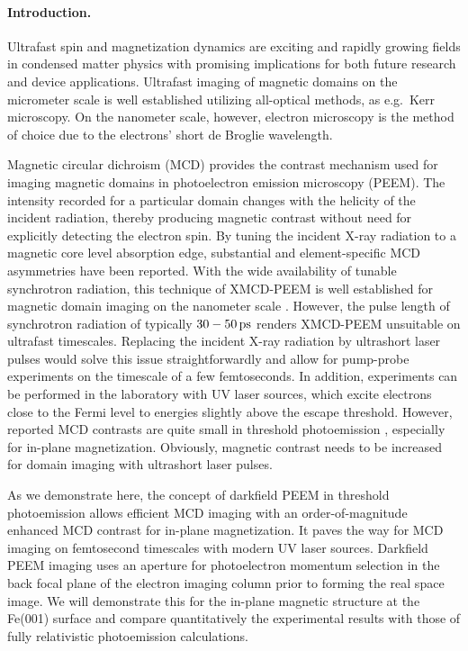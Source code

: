 \documentclass[prl,twocolumn,floatfix,superscriptaddress,aps]{revtex4-2}
\begin{document}
\pacs{}

\maketitle
\paragraph{Introduction.} Ultrafast spin and magnetization dynamics are exciting and rapidly growing fields in condensed matter physics with promising implications for both future research and device applications. Ultrafast imaging of magnetic domains on the micrometer scale is well established utilizing all-optical methods, as e.g.\ Kerr microscopy. On the nanometer scale, however, electron microscopy is the method of choice due to the electrons' short de Broglie wavelength. 

Magnetic circular dichroism (MCD) provides the contrast mechanism used for imaging magnetic domains in photoelectron emission microscopy (PEEM). The intensity recorded for a particular domain changes with the helicity of the incident radiation, thereby producing magnetic contrast without need for explicitly detecting the electron spin. By tuning the incident X-ray radiation to a magnetic core level absorption edge, substantial and element-specific MCD asymmetries have been reported. With the wide availability of tunable synchrotron radiation, this technique of XMCD-PEEM is well established for magnetic domain imaging on the nanometer scale \cite{kuch15}. However, the pulse length of synchrotron radiation of typically $\unit[30-50]{ps}$ renders XMCD-PEEM unsuitable on ultrafast timescales. Replacing the incident X-ray radiation by ultrashort laser pulses would solve this issue straightforwardly and allow for pump-probe experiments on the timescale of a  few femtoseconds. In addition, experiments can be performed in the laboratory with UV laser sources, which excite electrons close to the Fermi level to energies slightly above the escape threshold. However, reported MCD contrasts are quite small in threshold photoemission \cite{marx2000}, especially for in-plane magnetization. Obviously, magnetic contrast needs to be increased for domain imaging with ultrashort laser pulses.

As we demonstrate here, the concept of darkfield PEEM in threshold photoemission allows efficient MCD imaging with an order-of-magnitude enhanced MCD contrast for in-plane magnetization. It paves the way for MCD imaging on femtosecond timescales with modern UV laser sources. Darkfield PEEM imaging uses an aperture for photoelectron momentum selection in the back focal plane of the electron imaging column prior to forming the real space image. We will demonstrate this for the in-plane magnetic structure at the Fe(001) surface and compare quantitatively the experimental results with those of fully relativistic photoemission calculations.
\end{document}
